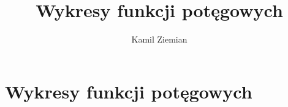 \documentclass[a4paper,11pt]{article}
\title{Wykresy funkcji potęgowych}
\author{Kamil Ziemian}
\numberwithin{equation}{section}
\begin{document}





\maketitle




















\section{Wykresy funkcji potęgowych}

\label{sec:Funkcje-trygonometryczne}
\end{document}
